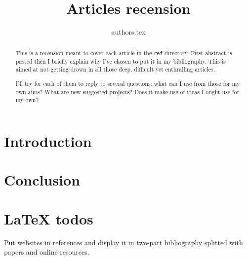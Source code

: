 \documentclass[12pt,onecolumn]{article}
\title{Articles recension}
\author{{authors.tex}}
\newcommand\directory{../../}
\begin{document}
\maketitle
{}
\begin{abstract}
\par This is a recension meant to cover each article in the \texttt{ref} directory. First abstract is pasted then I briefly explain why I've chosen to put it in my bibliography. This is aimed at not getting drown in all those deep, difficult yet enthralling articles.\par I'll try for each of them to reply to several questions: what can I use from those for my own aims? What are new suggested projects? Does it make use of ideas I ought use for my own?
\end{abstract}

\tableofcontents
\cleardoublepage

\section*{Introduction}

\section{}



\section*{Conclusion}

\section{\LaTeX{} todos}
Put websites in references and display it in two-part bibliography splitted with papers and online resources.


\end{document}
